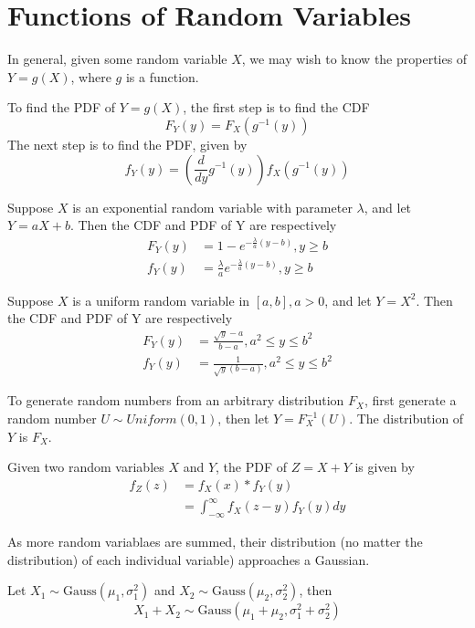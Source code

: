 \section{Functions of Random Variables}

In general, given some random variable
$X$, we may wish to know the properties
of $Y = g(X)$, where $g$ is a function.

To find the PDF of $Y = g(X)$, the first
step is to find the CDF
\begin{equation}
    F_Y(y) = F_X(g^{-1}(y))
\end{equation}
The next step is to find the PDF, given by
\begin{equation}
    f_Y(y) = \left(\frac{d}{dy}g^{-1}(y)\right)f_X(g^{-1}(y))
\end{equation}

Suppose $X$ is an exponential random variable
with parameter $\lambda$, and let $Y  = aX + b$.
Then the CDF and PDF of Y are respectively
\begin{align}
    F_Y(y) & = 1 - e^{-\frac{\lambda}{a}(y - b)}, y \geq b              \\
    f_Y(y) & = \frac{\lambda}{a}e^{-\frac{\lambda}{a}(y - b)}, y \geq b
\end{align}

Suppose $X$ is a uniform random variable in $\left[a, b\right], a > 0$,
and let $Y = X^2$. Then the CDF and PDF of Y are respectively
\begin{align}
    F_Y(y) & = \frac{\sqrt{y} - a}{b - a}, a^2 \leq y \leq b^2 \\
    f_Y(y) & = \frac{1}{\sqrt{y}(b - a)}, a^2 \leq y \leq b^2
\end{align}

To generate random numbers from an arbitrary
distribution $F_X$, first generate a random
number $U \sim Uniform(0,1)$, then let
$Y = F^{-1}_X(U)$. The distribution of $Y$ is
$F_X$.

Given two random variables $X$ and $Y$, the
PDF of $Z = X + Y$ is given by
\begin{align}
    f_Z(z) & = f_X(x) * f_Y(y)                          \\
           & = \int_{-\infty}^{\infty} f_X(z-y)f_Y(y)dy
\end{align}

As more random variablaes are summed, their
distribution (no matter the distribution) of each
individual variable) approaches a Gaussian.

Let $X_1 \sim \text{Gauss}(\mu_1, \sigma_1^2)$ and
$X_2 \sim \text{Gauss}(\mu_2, \sigma_2^2)$, then
\begin{equation}
    X_1 + X_2 \sim \text{Gauss}\left( \mu_1 + \mu_2, \sigma_1^2 + \sigma_2^2 \right)
\end{equation}

